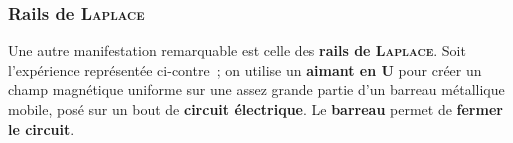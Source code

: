 \documentclass[../../main/main.tex]{subfiles}
\begin{document}
\subsubsection{Rails de \textsc{Laplace}}
\vspace{-20pt}
\noindent
\begin{minipage}[c]{.65\linewidth}
	Une autre manifestation remarquable est celle des \textbf{rails de
		\textsc{Laplace}}. Soit l'expérience représentée ci-contre~;
	on utilise un \textbf{aimant en U} pour créer un champ magnétique uniforme sur une assez
	grande partie d'un barreau métallique mobile, posé sur un bout de \textbf{circuit
		électrique}. Le \textbf{barreau} permet de \textbf{fermer le circuit}.
\end{minipage}
\hfill
\begin{minipage}[c]{.30\linewidth}
	\begin{center}
		\vspace{-15pt}
		\captionsetup{justification=centering}
		\label{fig:rlp_1}
	\end{center}
\end{minipage}
\end{document}
